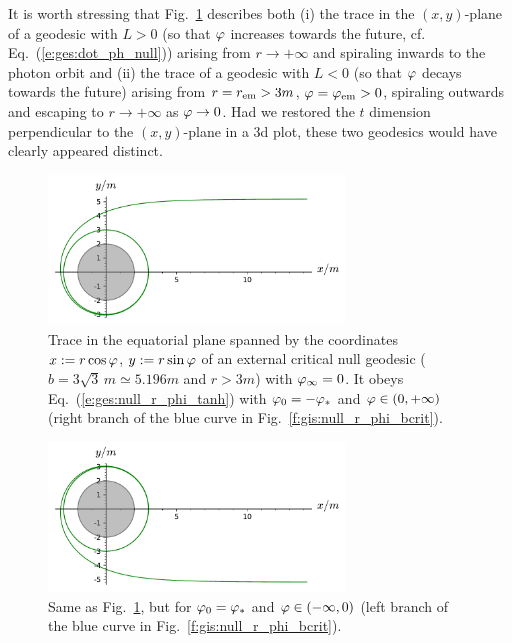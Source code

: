 It is worth stressing that Fig.~\ref{f:gis:null_b_crit_from_inf_L_pos} describes both (i) the trace
in the $(x,y)$-plane of a
geodesic with $L>0$ (so that $\varphi$ increases towards the future, cf. Eq.~(\ref{e:ges:dot_ph_null})) arising from $r\to + \infty$
and spiraling inwards to the photon orbit
and (ii) the trace of a geodesic with $L<0$ (so that $\varphi$ decays towards the future)
arising from $r=r_{\rm em} > 3 m$, $\varphi=\varphi_{\rm em}>0$,
spiraling outwards and escaping to $r\to +\infty$ as $\varphi\to 0$. Had we restored the
$t$ dimension perpendicular to the $(x,y)$-plane in a 3d plot, these two geodesics would have
clearly appeared distinct.

\begin{figure}
\centerline{\includegraphics[width=0.7\textwidth]{ges_null_b_crit_from_inf_L_pos.pdf}}
\caption[]{\label{f:gis:null_b_crit_from_inf_L_pos} \footnotesize
Trace in the equatorial plane spanned by the coordinates $x:=r\cos\varphi$, $y:=r\sin\varphi$
of an external critical null geodesic ($b = 3\sqrt{3} \, m \simeq 5.196 m$ and
$r>3m$) with $\varphi_\infty=0$.
It obeys Eq.~(\ref{e:ges:null_r_phi_tanh}) with $\varphi_0 = -\varphi_*$ and $\varphi\in(0,+\infty)$
(right branch of the blue curve in Fig.~\ref{f:gis:null_r_phi_bcrit}).}
\end{figure}

\begin{figure}
\centerline{\includegraphics[width=0.7\textwidth]{ges_null_b_crit_from_inf_L_neg.pdf}}
\caption[]{\label{f:gis:null_b_crit_from_inf_L_neg} \footnotesize
Same as Fig.~\ref{f:gis:null_b_crit_from_inf_L_pos}, but for $\varphi_0 = \varphi_*$
and $\varphi\in(-\infty,0)$ (left branch of the blue curve in Fig.~\ref{f:gis:null_r_phi_bcrit}).}
\end{figure}

